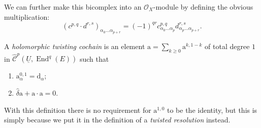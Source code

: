 \documentclass[11pt,notitlepage]{article}
\numberwithin{equation}{subsection}
\DeclareMathOperator{\End}{End}
\renewcommand{\d}{\mathrm{d}}
\renewcommand{\C}{\mathscr{C}}
\begin{document}
                We can further make this bicomplex into an $\mathcal{O}_X$-module by defining the obvious multiplication:
                \[
                    (c^{p,q}\cdot d^{r,s})_{\alpha_0\ldots\alpha_{p+r}} = (-1)^{qr}c^{p,q}_{\alpha_0\ldots\alpha_{p}}d^{r,s}_{\alpha_p\ldots\alpha_{p+r}}.
                \]

                \begin{definition}
                    A \textit{holomorphic twisting cochain} is an element $\mathrm{a}=\sum_{k\geqslant0}\mathrm{a}^{k,1-k}$ of total degree $1$ in $\hat{\C}^p(\underline{U},\End^q(E))$ such that
                    \begin{enumerate}
                        \item $\mathrm{a}^{0,1}_\alpha=\d_\alpha$;
                        \item $\hat{\delta}\mathrm{a}+\mathrm{a}\cdot\mathrm{a}=0$. \qedhere
                    \end{enumerate}
                \end{definition}

                \begin{note}
                    With this definition there is no requirement for $\mathrm{a}^{1,0}$ to be the identity, but this is simply because we put it in the definition of a \emph{twisted resolution} instead.
                \end{note}
\end{document}
